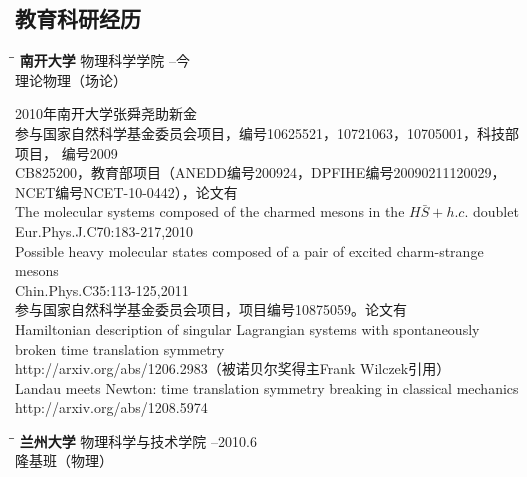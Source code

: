 \documentclass{res}
\begin{document}
\begin{CJK}{UTF8}{gbsn}
\begin{resume}
\section{教育科研经历}
   \vspace{-0.1in}	
   \begin{tabbing}
   \hspace{2.3in}\= \hspace{2.6in}\= \kill %
    {\bf 南开大学} \>物理科学学院     --今\\
                             \>理论物理（场论）
   \end{tabbing}\vspace{-20pt}      %
    2010年南开大学张舜尧助新金\\
    参与国家自然科学基金委员会项目，编号10625521，10721063，10705001，科技部项目，
编号2009\\CB825200，教育部项目（ANEDD编号200924，DPFIHE编号20090211120029，
NCET编号NCET-10-0442），论文有\\
    The molecular systems composed of the charmed mesons in the $H\bar{S}+h.c.$ doublet\\ 		    
    Eur.Phys.J.C70:183-217,2010 \\
    Possible heavy molecular states composed of a pair of excited charm-strange mesons\\
    Chin.Phys.C35:113-125,2011\\
    参与国家自然科学基金委员会项目，项目编号10875059。论文有\\
    Hamiltonian description of singular Lagrangian systems with spontaneously broken time translation symmetry\\
    http://arxiv.org/abs/1206.2983（被诺贝尔奖得主Frank Wilczek引用）\\
    Landau meets Newton: time translation symmetry breaking in classical mechanics\\
    http://arxiv.org/abs/1208.5974
    \vspace{-0.1in}
   \begin{tabbing}
   \hspace{2.3in}\= \hspace{2.6in}\= \kill %
    {\bf 兰州大学} \>物理科学与技术学院 --2010.6\\
                          \>隆基班（物理）
   \end{tabbing}\vspace{-20pt}

\end{resume}
\end{CJK}
\end{document}
